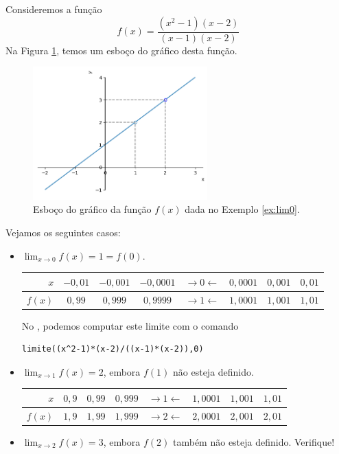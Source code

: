 \cleardoublepage\documentclass[../main.tex]{subfiles}
\begin{document}
\begin{ex}\label{ex:lim0}
  Consideremos a função
  \begin{equation*}
    f(x) = \frac{(x^2-1)(x-2)}{(x-1)(x-2)}
  \end{equation*}
  Na Figura \ref{fig:ex_lim0}, temos um esboço do gráfico desta função.

  \begin{figure}[H]
    \centering
    \includegraphics[width=0.6\textwidth]{fig_lim/fig_ex_lim0}
    \caption{Esboço do gráfico da função $f(x)$ dada no Exemplo \ref{ex:lim0}.}
    \label{fig:ex_lim0}
  \end{figure}


  Vejamos os seguintes casos:
  \begin{itemize}
  \item $\displaystyle \lim_{x\to 0} f(x) = 1 = f(0)$.
    
    \begin{tabular}{r|ccc|c|ccc}
      $x$ & $-0,01$ & $-0,001$ & $-0,0001$ & $\rightarrow 0 \leftarrow$ & $0,0001$ & $0,001$ & $0,01$\\\hline
      $f(x)$ & $0,99$ & $0,999$ & $0,9999$ & $\rightarrow 1 \leftarrow$ & $1,0001$ & $1,001$ & $1,01$
    \end{tabular}

    
    No \geogebra, podemos computar este limite com o comando
\begin{verbatim}
limite((x^2-1)*(x-2)/((x-1)*(x-2)),0)
\end{verbatim}
   
  \item $\displaystyle \lim_{x\to 1} f(x) = 2$, embora $f(1)$ não esteja definido.
    
    \begin{tabular}{r|ccc|c|ccc}
      $x$ & $0,9$ & $0,99$ & $0,999$ & $\rightarrow 1 \leftarrow$ & $1,0001$ & $1,001$ & $1,01$\\\hline
      $f(x)$ & $1,9$ & $1,99$ & $1,999$ & $\rightarrow 2 \leftarrow$ & $2,0001$ & $2,001$ & $2,01$
    \end{tabular}
  \item $\displaystyle \lim_{x\to 2} f(x) = 3$, embora $f(2)$ também não esteja definido. Verifique!
  \end{itemize}
\end{ex}
\end{document}
